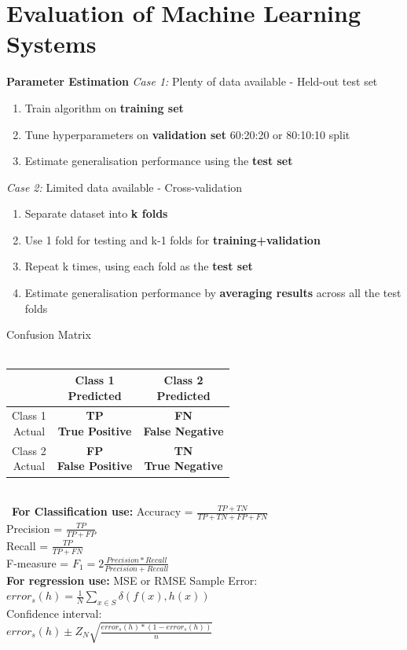 \documentclass[a4paper, 10pt, twocolumn]{article}
\begin{document}
\section{Evaluation of Machine Learning Systems}
\textbf{Parameter Estimation}
\textit{Case 1:} Plenty of data available - Held-out test set
\begin{enumerate}[topsep=0pt,itemsep=-1ex,partopsep=1ex,parsep=1ex]
	\item Train algorithm on  \textbf{training set}
	\item Tune hyperparameters on  \textbf{validation set} 60:20:20 or 80:10:10 split
	\item Estimate generalisation performance using the  \textbf{test set}
\end{enumerate}
\textit{Case 2:} Limited data available - Cross-validation
\begin{enumerate}[topsep=0pt,itemsep=-1ex,partopsep=1ex,parsep=1ex]
	\item Separate dataset into  \textbf{k folds}
	\item Use 1 fold for testing and k-1 folds for  \textbf{training+validation}
	\item Repeat k times, using each fold as the  \textbf{test set}
	\item Estimate generalisation performance by \textbf{averaging results}
	across all the test folds
\end{enumerate}
Confusion Matrix \\ \\
\begin{tabular} {| c | c | c |}
	\hline
 & \thead{Class 1 \\ Predicted} & \thead{Class 2 \\ Predicted} \\
 \hline
 \thead{Class 1 \\ Actual} &  \thead{\bf TP \\ True Positive} & \thead{\bf FN \\False Negative} \\
 \hline
 \thead{Class 2 \\ Actual} &  \thead{\bf FP \\ False Positive} & \thead{\bf TN \\ True Negative} \\
 \hline
\end{tabular} \\\
\textbf{For Classification use:}
Accuracy = $\frac{TP + TN}{TP + TN + FP + FN}$ \\ 
Precision = $\frac{TP}{TP + FP}$ \\
Recall = $\frac{TP}{TP + FN}$ \\
F-measure = $F_1 = 2\frac{Precision*Recall}{Precision + Recall}$\\
\textbf{For regression use:}
MSE or RMSE
Sample Error: \\$error_s(h) = \frac{1}{N} \sum_{x \in S} \delta (f(x),h(x))$\\
Confidence interval: \\ $error_s(h) \pm Z_N \sqrt{\frac{error_s(h)*(1-error_s(h))}{n}}$
\end{document}

